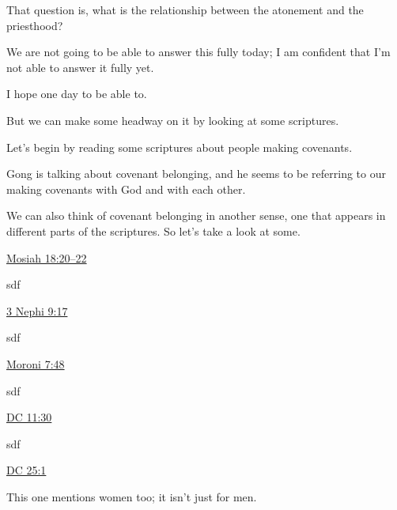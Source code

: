 \begin{compactitem}
			\item That question is, what is the relationship between the atonement and the priesthood?
				\begin{compactitem}
					\item We are not going to be able to answer this fully today; I am confident that I'm not able to answer it fully yet.
					\item I hope one day to be able to.
					\item But we can make some headway on it by looking at some scriptures.
				\end{compactitem}
			
			\item Let's begin by reading some scriptures about people making covenants.
				\begin{compactitem}
					\item Gong is talking about covenant belonging, and he seems to be referring to our making covenants with God and with each other. 
					\item We can also think of covenant belonging in another sense, one that appears in different parts of the scriptures. So let's take a look at some.
					\item \hyperref[MOSIAH-18-20]{Mosiah 18:20--22}
						\begin{compactitem}
							\item sdf
						\end{compactitem}
					\item \hyperref[3NEPHI-9-17]{3 Nephi 9:17}
						\begin{compactitem}
							\item sdf
						\end{compactitem}
					\item \hyperref[MORONI-7-48]{Moroni 7:48}
						\begin{compactitem}
							\item sdf
						\end{compactitem}
					\item \hyperref[DC11-30]{DC 11:30}
						\begin{compactitem}
							\item sdf
						\end{compactitem}
					\item \hyperref[DC25-1]{DC 25:1}
						\begin{compactitem}
							\item This one mentions women too; it isn't just for men.
						\end{compactitem}

\end{compactitem}
\end{compactitem}
